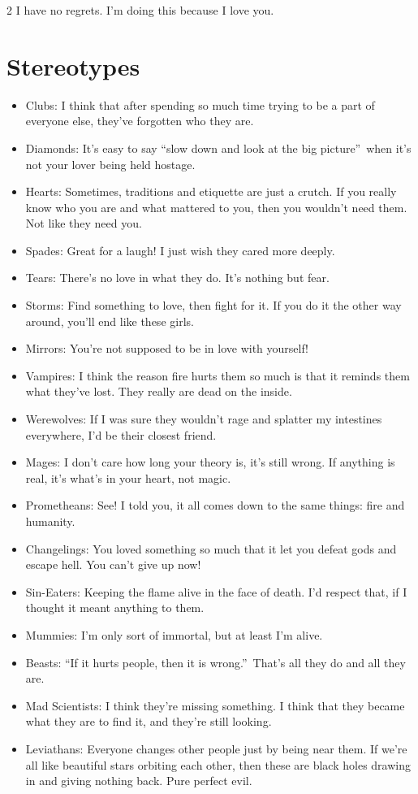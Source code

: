 \begin{multicols}{2}
I have no regrets. I'm doing this because I love you.

\section*{Stereotypes}

\begin{itemize}
\item Clubs: I think that after spending so much time trying to be a part of everyone else, they've forgotten who they are.
\item Diamonds: It's easy to say \textquotedblleft slow down and look at the big picture\textquotedblright\, when it's not your lover being held hostage.
\item Hearts: Sometimes, traditions and etiquette are just a crutch. If you really know who you are and what mattered to you, then you wouldn't need them. Not like they need you.
\item Spades: Great for a laugh! I just wish they cared more deeply.
\item Tears: There's no love in what they do. It's nothing but fear.
\item Storms: Find something to love, then fight for it. If you do it the other way around, you'll end like these girls. 
\item Mirrors: You're not supposed to be in love with yourself!

\item Vampires: I think the reason fire hurts them so much is that it reminds them what they've lost. They really are dead on the inside.
\item Werewolves: If I was sure they wouldn't rage and splatter my intestines everywhere, I'd be their closest friend.
\item Mages: I don't care how long your theory is, it's still wrong. If anything is real, it's what's in your heart, not magic.
\item Prometheans: See! I told you, it all comes down to the same things: fire and humanity.
\item Changelings: You loved something so much that it let you defeat gods and escape hell. You can't give up now!
\item Sin-Eaters: Keeping the flame alive in the face of death. I'd respect that, if I thought it meant anything to them.
\item Mummies: I'm only sort of immortal, but at least I'm alive. 
\item Beasts: \textquotedblleft If it hurts people, then it is wrong.\textquotedblright\, That's all they do and all they are.
\item Mad Scientists: I think they're missing something. I think that they became what they are to find it, and they're still looking.
\item Leviathans: Everyone changes other people just by being near them. If we're all like beautiful stars orbiting each other, then these are black holes drawing in and giving nothing back. Pure perfect evil.


\end{itemize}
\end{multicols}
